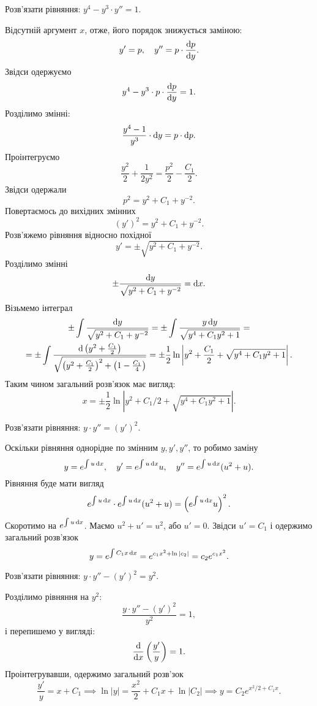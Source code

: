 \begin{example}
	Розв’язати рівняння: $y^4 - y^3 \cdot y'' = 1$.
\end{example}
\begin{solution}
	Відсутній аргумент $x$, отже, його порядок знижується заміною: \[y'=p,\quad y''=p\cdot\frac{\mathop{}\!\mathrm{d} p}{\mathop{}\!\mathrm{d} y}.\] Звідси одержуємо \[ y^4 - y^3 \cdot p \cdot \frac{\mathop{}\!\mathrm{d} p}{\mathop{}\!\mathrm{d} y} = 1.\] Розділимо змінні: \[ \frac{y^4-1}{y^3} \cdot \mathop{}\!\mathrm{d} y=p \cdot \mathop{}\!\mathrm{d} p.\] Проінтегруємо \[ \frac{y^2}{2}+\frac{1}{2y^2}=\frac{p^2}{2}-\frac{C_1}{2}.\] Звідси одержали \[p^2=y^2+C_1+y^{-2}.\] Повертаємось до вихідних змінних \[(y')^2=y^2+C_1+y^{-2}.\] Розв’яжемо рівняння відносно похідної \[ y' = \pm \sqrt{y^2 + C_1 + y^{-2}}.\] Розділимо змінні \[ \pm\frac{\mathop{}\!\mathrm{d} y}{\sqrt{y^2+C_1+y^{-2}}}=\mathop{}\!\mathrm{d} x.\] Візьмемо інтеграл \begin{multline*} \pm \int \frac{\mathop{}\!\mathrm{d} y}{\sqrt{y^2+C_1+y^{-2}}} = \pm \int \frac{y \mathop{}\!\mathrm{d} y}{\sqrt{y^4+C_1y^2+1}} = \\ =\pm \int \frac{\mathop{}\!\mathrm{d} \left(y^2 + \frac{C_1}{2}\right)}{\sqrt{\left(y^2+\frac{C_1}{2}\right)^2+\left(1-\frac{C_1}{4}\right)}} = \pm \frac12 \ln \left| y^2 + \frac{C_1}{2} + \sqrt{y^4+C_1y^2+1}\right|. \end{multline*} Таким чином загальний розв’язок має вигляд: \[x = \pm \frac12 \ln \left| y^2 + C_1/2 + \sqrt{y^4+C_1y^2+1}\right|.\]
\end{solution}
\begin{example}
	Розв’язати рівняння: $y \cdot y'' = (y')^2$.
\end{example}
\begin{solution}
	Оскільки рівняння однорідне по змінним $y, y', y''$, то робимо заміну \[ y = e^{\int u \mathop{}\!\mathrm{d} x}, \quad y' = e^{\int u \mathop{}\!\mathrm{d} x} u, \quad y'' = e^{\int u \mathop{}\!\mathrm{d} x} (u^2 +u). \] Рівняння буде мати вигляд \[ e^{\int u \mathop{}\!\mathrm{d} x} \cdot e^{\int u \mathop{}\!\mathrm{d} x} (u^2 + u) = \left( e^{\int u \mathop{}\!\mathrm{d} x} u\right)^2.\] Скоротимо на $e^{\int u \mathop{}\!\mathrm{d} x}$. Маємо $u^2 + u' = u^2$, або $u'=0$. Звідси $u'=C_1$ і одержимо загальний розв’язок \[ y = e^{\int C_1 x \mathop{}\!\mathrm{d} x} = e^{c_1 x^2 + \ln |c_2|}=c_2 e^{c_1x^2}.\]
\end{solution}
\begin{example}
	Розв’язати рівняння: $y \cdot y'' - (y')^2 = y^2$.
\end{example} 
\begin{solution}
	Розділимо рівняння на $y^2$: \[ \frac{y \cdot y'' - (y')^2}{y^2} = 1,\] і перепишемо у вигляді: \[ \frac{\mathop{}\!\mathrm{d}}{\mathop{}\!\mathrm{d} x} \left( \frac{y'}{y}\right)=1.\] Проінтегрувавши, одержимо загальний розв’зок \[\frac{y'}{y}=x+C_1\implies \ln |y| = \frac{x^2}{2}+C_1x+\ln |C_2|\implies y=C_2 e^{x^2/2+C_1x}.\]
\end{solution}
